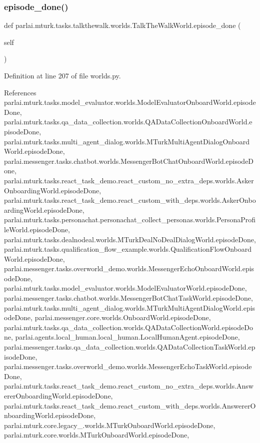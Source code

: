 \subsubsection{\texorpdfstring{episode\+\_\+done()}{episode\_done()}}
{\footnotesize\ttfamily def parlai.\+mturk.\+tasks.\+talkthewalk.\+worlds.\+Talk\+The\+Walk\+World.\+episode\+\_\+done (\begin{DoxyParamCaption}\item[{}]{self }\end{DoxyParamCaption})}



Definition at line 207 of file worlds.\+py.



References parlai.\+mturk.\+tasks.\+model\+\_\+evaluator.\+worlds.\+Model\+Evaluator\+Onboard\+World.\+episode\+Done, parlai.\+mturk.\+tasks.\+qa\+\_\+data\+\_\+collection.\+worlds.\+Q\+A\+Data\+Collection\+Onboard\+World.\+episode\+Done, parlai.\+mturk.\+tasks.\+multi\+\_\+agent\+\_\+dialog.\+worlds.\+M\+Turk\+Multi\+Agent\+Dialog\+Onboard\+World.\+episode\+Done, parlai.\+messenger.\+tasks.\+chatbot.\+worlds.\+Messenger\+Bot\+Chat\+Onboard\+World.\+episode\+Done, parlai.\+mturk.\+tasks.\+react\+\_\+task\+\_\+demo.\+react\+\_\+custom\+\_\+no\+\_\+extra\+\_\+deps.\+worlds.\+Asker\+Onboarding\+World.\+episode\+Done, parlai.\+mturk.\+tasks.\+react\+\_\+task\+\_\+demo.\+react\+\_\+custom\+\_\+with\+\_\+deps.\+worlds.\+Asker\+Onboarding\+World.\+episode\+Done, parlai.\+mturk.\+tasks.\+personachat.\+personachat\+\_\+collect\+\_\+personas.\+worlds.\+Persona\+Profile\+World.\+episode\+Done, parlai.\+mturk.\+tasks.\+dealnodeal.\+worlds.\+M\+Turk\+Deal\+No\+Deal\+Dialog\+World.\+episode\+Done, parlai.\+mturk.\+tasks.\+qualification\+\_\+flow\+\_\+example.\+worlds.\+Qualification\+Flow\+Onboard\+World.\+episode\+Done, parlai.\+messenger.\+tasks.\+overworld\+\_\+demo.\+worlds.\+Messenger\+Echo\+Onboard\+World.\+episode\+Done, parlai.\+mturk.\+tasks.\+model\+\_\+evaluator.\+worlds.\+Model\+Evaluator\+World.\+episode\+Done, parlai.\+messenger.\+tasks.\+chatbot.\+worlds.\+Messenger\+Bot\+Chat\+Task\+World.\+episode\+Done, parlai.\+mturk.\+tasks.\+multi\+\_\+agent\+\_\+dialog.\+worlds.\+M\+Turk\+Multi\+Agent\+Dialog\+World.\+episode\+Done, parlai.\+messenger.\+core.\+worlds.\+Onboard\+World.\+episode\+Done, parlai.\+mturk.\+tasks.\+qa\+\_\+data\+\_\+collection.\+worlds.\+Q\+A\+Data\+Collection\+World.\+episode\+Done, parlai.\+agents.\+local\+\_\+human.\+local\+\_\+human.\+Local\+Human\+Agent.\+episode\+Done, parlai.\+messenger.\+tasks.\+qa\+\_\+data\+\_\+collection.\+worlds.\+Q\+A\+Data\+Collection\+Task\+World.\+episode\+Done, parlai.\+messenger.\+tasks.\+overworld\+\_\+demo.\+worlds.\+Messenger\+Echo\+Task\+World.\+episode\+Done, parlai.\+mturk.\+tasks.\+react\+\_\+task\+\_\+demo.\+react\+\_\+custom\+\_\+no\+\_\+extra\+\_\+deps.\+worlds.\+Answerer\+Onboarding\+World.\+episode\+Done, parlai.\+mturk.\+tasks.\+react\+\_\+task\+\_\+demo.\+react\+\_\+custom\+\_\+with\+\_\+deps.\+worlds.\+Answerer\+Onboarding\+World.\+episode\+Done, parlai.\+mturk.\+core.\+legacy\+\_.\+worlds.\+M\+Turk\+Onboard\+World.\+episode\+Done, parlai.\+mturk.\+core.\+worlds.\+M\+Turk\+Onboard\+World.\+episode\+Done, 